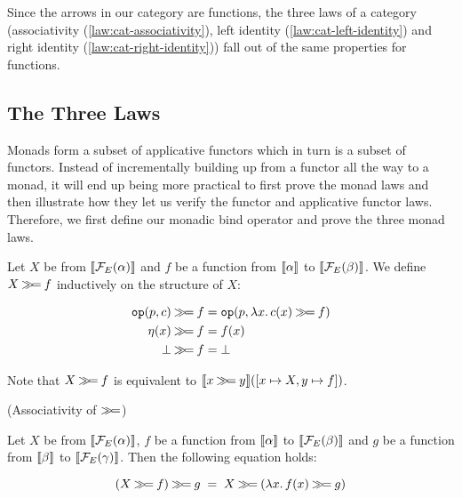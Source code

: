 Since the arrows in our category are functions, the three laws of a
category (associativity (\ref{law:cat-associativity}), left identity
(\ref{law:cat-left-identity}) and right identity
(\ref{law:cat-right-identity})) fall out of the same properties for
functions.


\subsection{The Three Laws}
\label{ssec:three-laws}

Monads form a subset of applicative functors which in turn is a subset of
functors. Instead of incrementally building up from a functor all the way
to a monad, it will end up being more practical to first prove the monad
laws and then illustrate how they let us verify the functor and applicative
functor laws. Therefore, we first define our monadic bind operator and
prove the three monad laws.

\begin{definition}\label{def:bind}
  Let $X$ be from $\llbracket \mathcal{F}_E(\alpha) \rrbracket$ and $f$ be a function from
  $\llbracket \alpha \rrbracket$ to $\llbracket \mathcal{F}_E(\beta) \rrbracket$. We define $X \mathbin{\gg\!=} f$
  inductively on the structure of $X$:

  \begin{align*}
    \mathtt{op}(p, c) \mathbin{\gg\!=} f &= \mathtt{op}(p, \lambda x.\, c(x) \mathbin{\gg\!=} f) \\
    \eta(x) \mathbin{\gg\!=} f &= f(x) \\
    \bot \mathbin{\gg\!=} f &= \bot
  \end{align*}

  Note that $X \mathbin{\gg\!=} f$ is equivalent to
  $\llbracket x \mathbin{\gg\!=} y \rrbracket([x \mapsto X, y \mapsto f])$.
\end{definition}

\begin{law}\label{law:associativity}
  (Associativity of $\mathbin{\gg\!=}$)
  
  Let $X$ be from $\llbracket \mathcal{F}_E(\alpha) \rrbracket$, $f$ be a function from
  $\llbracket \alpha \rrbracket$ to $\llbracket \mathcal{F}_E(\beta) \rrbracket$ and $g$ be a function from
  $\llbracket \beta \rrbracket$ to $\llbracket \mathcal{F}_E(\gamma) \rrbracket$. Then the following equation
  holds:
  
  $$
  (X \mathbin{\gg\!=} f) \mathbin{\gg\!=} g \;=\; X \mathbin{\gg\!=} (\lambda x.\, f(x) \mathbin{\gg\!=} g)
  $$
\end{law}

